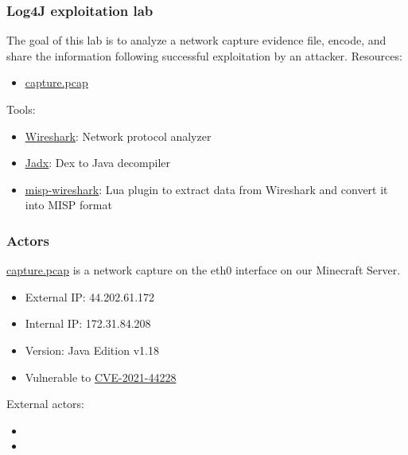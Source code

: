 
\begin{frame}[t,plain]
\titlepage
\end{frame}

\begin{frame}
    \frametitle{Log4J exploitation lab}
    The goal of this lab is to analyze a network capture evidence file, encode, and share the information following successful exploitation by an attacker.
	\linebreak[3]
    Resources:
    \begin{itemize}
        \item \href{https://github.com/MISP/misp-training-lea/tree/main/e.304-lab3-encoding-information-and-sharing-it-2/dataset/capture.pcap}{\underline{capture.pcap}}
    \end{itemize}
    Tools:
    \begin{itemize}
        \item \href{https://www.wireshark.org/}{\underline{Wireshark}}: Network protocol analyzer
        \item \href{https://github.com/skylot/jadx}{\underline{Jadx}}: Dex to Java decompiler
        \item \href{https://github.com/MISP/misp-wireshark}{\underline{misp-wireshark}}: Lua plugin to extract data from Wireshark and convert it into MISP format 
    \end{itemize}

    \note[item]{}
\end{frame}

\begin{frame}
    \frametitle{Actors}
    \href{https://github.com/MISP/misp-training-lea/tree/main/e.304-lab3-encoding-information-and-sharing-it-2/dataset/capture.pcap}{\underline{capture.pcap}} is a network capture on the eth0 interface on our Minecraft Server.
    \linebreak[2]
    {\color{blue}{\bf Minecraft Server}}
    \begin{itemize}
    	\item External IP: 44.202.61.172
	    \item Internal IP: 172.31.84.208
	    \item Version: Java Edition v1.18 
	    \item Vulnerable to \href{https://nvd.nist.gov/vuln/detail/CVE-2021-44228}{CVE-2021-44228}
    \end{itemize}
    
    External actors:
    \begin{itemize}
        \item {\color{green}{\bf Player}}
        \item {\color{red}{\bf Attacker}}
    \end{itemize}

    \note[item]{}
\end{frame}

